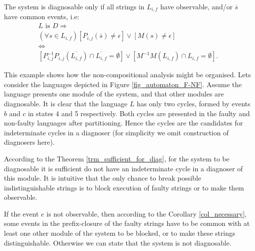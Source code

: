 \documentclass[a4paper, 10pt, conference]{ieeeconf} \IEEEoverridecommandlockouts
\begin{document}
\begin{corollary} The system is
diagnosable only if all strings in $L_{i,f}$ have observable, and/or
$\overline{s}$ have common events, i.e:
\label{col_necessary}
\begin{equation}
\begin{array}{l}
	L \textrm{ is }D \Rightarrow 
	\\[2ex]
	(\forall s \in L_{i,f}) 
	\left[
		P_{i,j}(\overline{s}) \neq \epsilon
	\right]
		\lor 
	\left[
		M(s) \neq \epsilon 
	\right]
	\\[1ex]
	\Leftrightarrow
	\\[1ex]
	\left[
	P^{-1}_{i,j}P_{i,j}(\overline{L_{i,f}})\cap \overline{L_{i,f}} = \emptyset 
	\right]
		\lor
	\left[
		M^{-1}M(L_{i,f})\cap L_{i,f} = \emptyset
	\right]. 
\end{array}
\end{equation}
\end{corollary}

\begin{example} This example shows how the non-compositional analysis might be
organised.
Lets consider the languages depicted in Figure \ref{fig_automaton_F-NF}.
Assume the language presents one module of the system, and that other modules
are diagnosable. It is clear that the language $L$ has only two cycles, formed
by events $b$ and $c$ in states 4 and 5 respectively.
Both cycles are presented in the faulty and non-faulty languages after
partitioning. Hence the cycles are the candidates for indeterminate cycles in a
diagnoser (for simplicity we omit construction of diagnosers here). 

According to the Theorem \ref{trm_sufficient_for_diag}, for the system to be 
diagnosable it is sufficient do not have an indeterminate cycle in a diagnoser
of this module. It is intuitive that the only chance to break
possible indistinguishable strings is to block execution of faulty strings
or to make them observable.

If the event $e$ is not observable, then according to the Corollary
\ref{col_necessary}, some events in the prefix-closure of the faulty strings
have to be common with at least one other module of the system to be blocked, or
to make these strings distinguishable. Otherwise we can state that the system
is not diagnosable.
\end{example}

\end{document}
